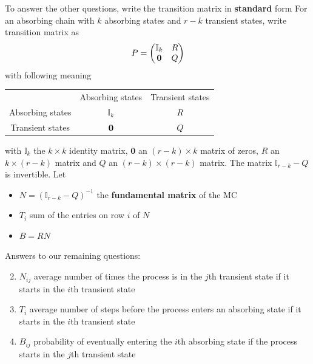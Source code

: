 \documentclass[aspectratio=169]{beamer}
\begin{document}
\begin{frame}
To answer the other questions, write the transition matrix in \textbf{standard} form
\vfill
For an absorbing chain with $k$ absorbing states and $r-k$ transient states, write transition matrix as
\[
P=\begin{pmatrix}
\mathbb{I}_k & R \\
\b0 & Q
\end{pmatrix}
\]
with following meaning
\begin{center}\footnotesize
\begin{tabular}{ccc}
& Absorbing states & Transient states \\
Absorbing states & $\mathbb{I}_k$ & $R$ \\
Transient states & $\b0$ & $Q$
\end{tabular}
\end{center}
with $\mathbb{I}_k$ the $k\times k$ identity matrix, $\mathbf{0}$ an $(r-k)\times k$ matrix of zeros, $R$ an $k\times (r-k)$ matrix and $Q$ an $(r-k)\times(r-k)$ matrix.
The matrix $\mathbb{I}_{r-k}-Q$ is invertible. Let
\begin{itemize}
\item $N=(\mathbb{I}_{r-k}-Q)^{-1}$ the \textbf{fundamental matrix} of the MC
\item $T_i$ sum of the entries on row $i$ of $N$
\item $B=RN$
\end{itemize}
\end{frame}

\begin{frame}
Answers to our remaining questions:
\vfill
\begin{enumerate}
\setcounter{enumi}{1}
\item $N_{ij}$ average number of times the process is in the $j$th transient state if it starts in the $i$th transient state
\vfill
\item $T_i$ average number of steps before the process enters an absorbing state if it starts in the $i$th transient state
\vfill
\item $B_{ij}$ probability of eventually entering the $i$th absorbing state if the process starts in the $j$th transient state
\end{enumerate}
\vfill
\end{frame}
\end{document}
